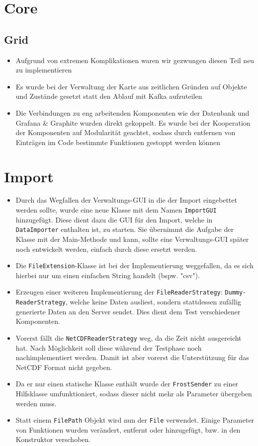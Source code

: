 \section{Core}
\subsection{Grid}
\begin{itemize}
	\item Aufgrund von extremen Komplikationen waren wir gezwungen diesen Teil neu zu implementieren
	\item Es wurde bei der Verwaltung der Karte aus zeitlichen Gründen auf Objekte und Zustände gesetzt statt den Ablauf mit Kafka aufzuteilen
	\item Die Verbindungen zu eng arbeitenden Komponenten wie der Datenbank und Grafana \& Graphite wurden direkt gekoppelt. Es wurde bei der Kooperation der Komponenten auf Modularität geachtet, sodass durch entfernen von Einträgen im Code bestimmte Funktionen gestoppt werden können
\end{itemize}
\section{Import}
\begin{itemize}
	\item Durch das Wegfallen der Verwaltungs-GUI in die der Import eingebettet werden sollte, wurde eine neue Klasse mit dem Namen \texttt{ImportGUI} hinzugefügt. Diese dient dazu die GUI für den Import, welche in \texttt{DataImporter} enthalten ist, zu starten. Sie übernimmt die Aufgabe der Klasse mit der Main-Methode und kann, sollte eine Verwaltungs-GUI später noch entwickelt werden, einfach durch diese ersetzt werden.
	\item Die \texttt{FileExtension}-Klasse ist bei der Implementierung weggefallen, da es sich hierbei nur um einen einfachen String handelt (bspw. "csv").
	\item Erzeugen einer weiteren Implementierung der \texttt{FileReaderStrategy}: \texttt{Dummy-\\ReaderStrategy}, welche keine Daten ausliest, sondern stattdessen zufällig generierte Daten an den Server sendet. Dies dient dem Test verschiedener Komponenten.
	\item Vorerst fällt die \texttt{NetCDFReaderStrategy} weg, da die Zeit nicht ausgereicht hat. Nach Möglichkeit soll diese während der Testphase noch nachimplementiert werden. Damit ist aber vorerst die Unterstützung für das NetCDF Format nicht gegeben.
	\item Da er nur einen statische Klasse enthält wurde der \texttt{FrostSender} zu einer Hilfsklasse umfunktioniert, sodass dieser nicht mehr als Parameter übergeben werden muss.
	\item Statt einem \texttt{FilePath} Objekt wird nun der \texttt{File} verwendet. Einige Parameter von Funktionen wurden verändert, entfernt oder hinzugefügt, bzw. in den Konstruktor verschoben.
\end{itemize}

